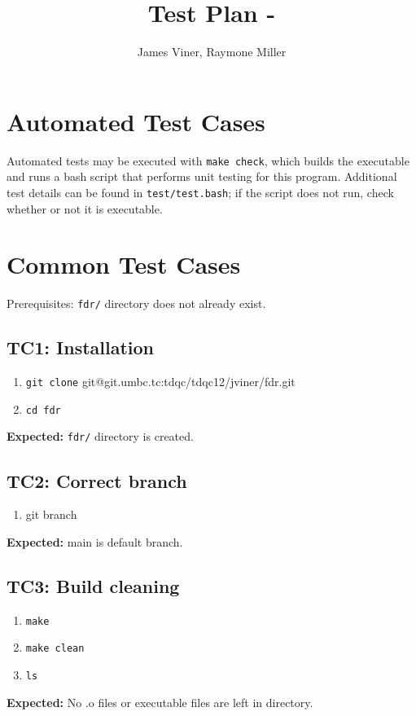 \documentclass[11pt]{report}
\title{Test Plan - \docname}
\author{James Viner, Raymone Miller}
\date{} %
\def\dirname{fdr}
\begin{document}
\maketitle

\doublespacing

\pagebreak
\section*{Automated Test Cases}
Automated tests may be executed with {\texttt{\color{MidnightBlue}make check}}, which builds the executable and runs a bash script that performs unit testing for this program. Additional test details can be found in {\texttt{\color{MidnightBlue}test/test.bash}}; if the script does not run, check whether or not it is executable.
\pagebreak
\section*{Common Test Cases}
Prerequisites: {\texttt{\color{MidnightBlue}\dirname/}} directory does not already exist.
\subsection*{TC1: Installation}
\begin{enumerate}
  \item {\texttt{\color{MidnightBlue}git clone} {\color{MidnightBlue}git@git.umbc.tc}}{\color{MidnightBlue}:tdqc/tdqc12/jviner/\dirname.git}
  \item {\texttt{\color{MidnightBlue}cd \dirname}}
\end{enumerate}
\textbf{Expected:} {\texttt{\color{MidnightBlue}\dirname/}} directory is created.
\subsection*{TC2: Correct branch}
\begin{enumerate}
  \item {\color{MidnightBlue}git branch}
\end{enumerate}
\textbf{Expected:} {\color{MidnightBlue}main} is default branch.
\subsection*{TC3: Build cleaning}
\begin{enumerate}
  \item {\texttt{\color{MidnightBlue}make}}
  \item {\texttt{\color{MidnightBlue}make clean}}
  \item {\texttt{\color{MidnightBlue}ls}}
\end{enumerate}
\textbf{Expected:} No .o files or executable files are left in directory.
\pagebreak
\end{document}
